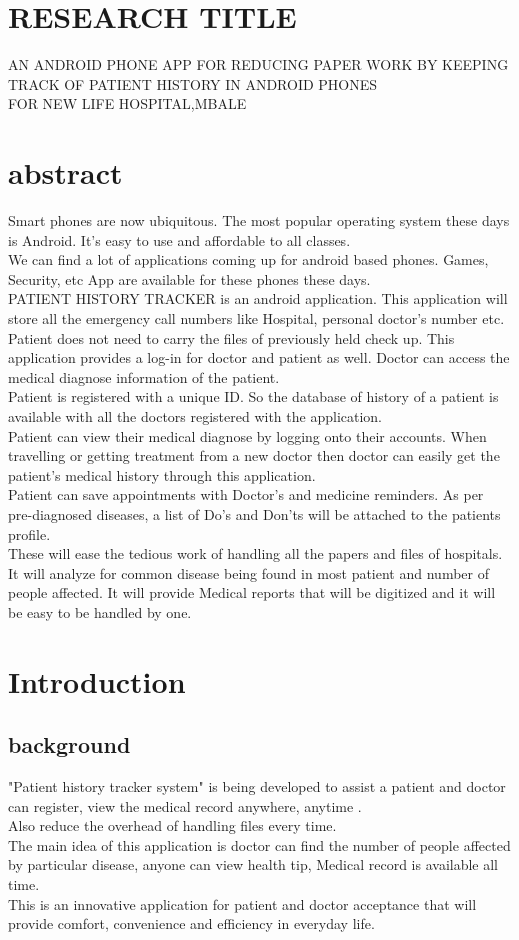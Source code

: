 \documentclass[12pt,]{article}
\begin{document}
\section{RESEARCH TITLE}
AN ANDROID PHONE APP FOR REDUCING PAPER WORK BY KEEPING TRACK OF PATIENT HISTORY IN ANDROID PHONES\\ FOR NEW LIFE HOSPITAL,MBALE 

\section{abstract}

Smart phones are now ubiquitous. The most popular operating system these days is Android. It’s easy to use and affordable to all classes.\\ We can find a lot of applications coming up for android based phones. Games, Security, etc App are available for these phones these days.\\ PATIENT HISTORY TRACKER is an android application. This application will store all the emergency call numbers like Hospital, personal doctor’s number etc. Patient does not need to carry the files of previously held check up. This application provides a log-in for doctor and patient as well. Doctor can access the medical diagnose information of the patient.\\ Patient is registered with a unique ID. So the database of history of a patient is available with all the doctors registered with the application.\\ Patient can view their medical diagnose by logging onto their accounts. When travelling or getting treatment from a new doctor then doctor can easily get the patient’s medical history through this application.\\ Patient can save appointments with Doctor’s and medicine reminders. As per pre-diagnosed diseases, a list of Do’s and Don’ts will be attached to the patients profile. \\These will ease the tedious work of handling all the papers and files of hospitals.\\ It will analyze for common disease being found in most patient and number of people affected. It will provide Medical reports that will be digitized and it will be easy to be handled by one.

\section{Introduction}
\subsection{background}
  "Patient history tracker system" is being developed to assist a patient and doctor can register, view the medical record anywhere, anytime .\\Also reduce the overhead of handling files every time.\\ The main idea of this application is doctor can find the number of people affected by particular disease, anyone can view health tip, Medical record is available all time.\\ This is an innovative application for patient and doctor acceptance that will provide comfort, convenience and efficiency in everyday life. 
\end{document}
